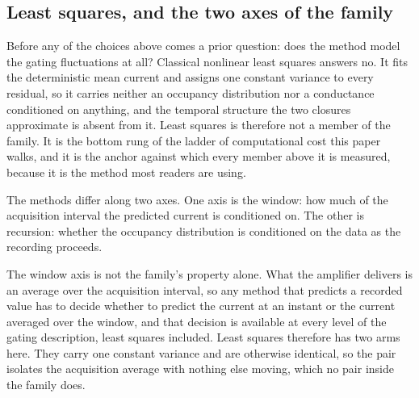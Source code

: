 \subsection*{Least squares, and the two axes of the family}

Before any of the choices above comes a prior question: does the method model the gating
fluctuations at all? Classical nonlinear least squares answers no. It fits
the deterministic mean current and assigns one constant variance to every residual, so it
carries neither an occupancy distribution nor a conductance conditioned on anything, and
the temporal structure the two closures approximate is absent from it. Least squares is
therefore not a member of the family. It is the bottom rung of the ladder of computational
cost this paper walks, and it is the anchor against which every member above it is
measured, because it is the method most readers are using.

The methods differ along two axes. One axis is the window: how much of the acquisition
interval the predicted current is conditioned on. The other is recursion: whether the
occupancy distribution is conditioned on the data as the recording proceeds.

The window axis is not the family's property alone. What the amplifier delivers is an
average over the acquisition interval, so any method that predicts a recorded value has to
decide whether to predict the current at an instant or the current averaged over the
window, and that decision is available at every level of the gating description, least
squares included. Least squares therefore has two arms here. They carry one constant
variance and are otherwise identical, so the pair isolates the acquisition average with
nothing else moving, which no pair inside the family does.

